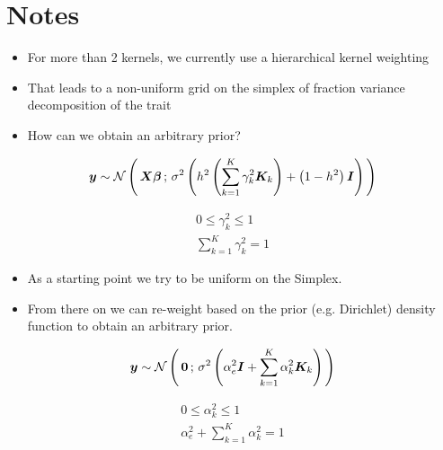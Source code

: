 \documentclass[twoside]{article}
\begin{document}
%
%
%
\printbibliography

\clearpage
\appendix


\section{Notes}
\begin{itemize}
\item For more than 2 kernels, we currently use a hierarchical kernel weighting
\item That leads to a non-uniform grid on the simplex of fraction variance decomposition of the trait
\item How can we obtain an arbitrary prior?
\end{itemize}

\begin{align*}
\bm{y} \sim \mathcal{N}\left(\, {\bm{X}\bm{\beta}} \,;\, {\sigma^2\left(h^2\left(\sum_{k=1}^K\gamma_k^2\bm{K}_k\right) + \left(1-h^2\right)\bm{I} \right) } \,\right)
\end{align*}

\begin{align*}
0 \leq \gamma_k^2 \leq 1
\\
\sum_{k=1}^K\gamma_k^2 = 1
\end{align*}
\begin{itemize}
\item As a starting point we try to be uniform on the Simplex.
\item From there on we can re-weight based on the prior (e.g. Dirichlet) density function to obtain an arbitrary prior.
\end{itemize}
\begin{align*}
\bm{y} \sim \mathcal{N}\left(\, {\bm{0}} \,;\, {\sigma^2\left( \alpha_e^2\bm{I} + \sum_{k=1}^K\alpha_k^2\bm{K}_k \right) } \,\right)
\end{align*}

\begin{align*}
0 \leq \alpha_k^2 \leq 1
\\
\alpha_e^2 + \sum_{k=1}^K\alpha_k^2 = 1
\end{align*}
\end{document}
